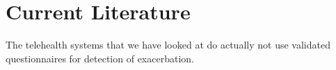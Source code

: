 

\section{Current Literature}

The telehealth systems that we have looked at do actually not use validated questionnaires for detection of exacerbation.